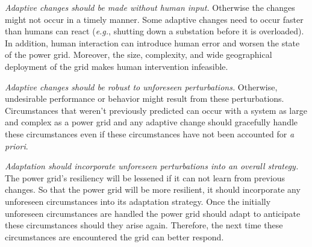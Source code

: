 \documentclass[conference]{IEEEtran}
\begin{document}
\emph{Adaptive changes should be made without human input.} Otherwise the changes might not occur in a timely manner. Some adaptive changes need to occur faster than humans can react (\emph{e.g.}, shutting down a substation before it is overloaded). In addition, human interaction can introduce human error and worsen the state of the power grid. Moreover, the size, complexity, and wide geographical deployment of the grid makes human intervention infeasible.

\emph{Adaptive changes should be robust to unforeseen perturbations.} Otherwise, undesirable performance or behavior might result from these perturbations. Circumstances that weren't previously predicted can occur with a system as large and complex as a power grid and any adaptive change should gracefully handle these circumstances even if these circumstances have not been accounted for \emph{a priori}.

\emph{Adaptation should incorporate unforeseen perturbations into an overall strategy.}
The power grid's resiliency will be lessened if it can not learn from previous changes. So that the power grid will be more resilient, it should incorporate any unforeseen circumstances into its adaptation strategy. Once the initially unforeseen circumstances are handled the power grid should adapt to anticipate these circumstances should they arise again. Therefore, the next time these circumstances are encountered the grid can better respond.
\end{document}
